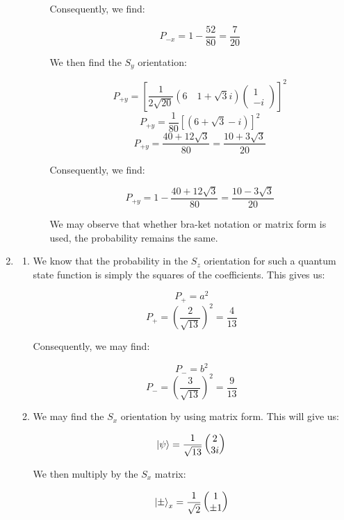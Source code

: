 \begin{enumerate}
\begin{enumerate}
\begin{enumerate}
            Consequently, we find:

            $$\boxed{P_{-x}=1-\frac{52}{80}=\frac{7}{20}}$$

            We then find the $S_y$ orientation:

            $$P_{+y}=\left[\frac{1}{2\sqrt{20}}\left( 6 \quad 1+\sqrt{3}i \right)\left( \begin{matrix} 1\\ -i\end{matrix} \right)\right]^2$$
            $$P_{+y}=\frac{1}{80}\left[\left( 6 +\sqrt{3} -i \right)\right]^2$$
            $$\boxed{P_{+y}=\frac{40+12\sqrt{3}}{80}=\frac{10+3\sqrt{3}}{20}}$$

            Consequently, we find:

            $$\boxed{P_{+y}=1-\frac{40+12\sqrt{3}}{80}=\frac{10-3\sqrt{3}}{20}}$$

            We may observe that whether bra-ket notation or matrix form is used, the probability remains the same.

        \end{enumerate}

    \end{enumerate}

  \item 

    \begin{enumerate}

      \item We know that the probability in the $S_z$ orientation for such a quantum state function is simply the squares of the coefficients. This gives us:

        $$P_+=a^2$$
        $$\boxed{P_+=\left(\frac{2}{\sqrt{13}}\right)^2=\frac{4}{13}}$$

        Consequently, we may find:

        $$P_-=b^2$$
        $$\boxed{P_-=\left(\frac{3}{\sqrt{13}}\right)^2=\frac{9}{13}}$$

      \item We may find the $S_x$ orientation by using matrix form. This will give us:

        $$\ket{\psi}=\frac{1}{\sqrt{13}}\left( \begin{matrix} 2\\ 3i \end{matrix}\right)$$

        We then multiply by the $S_x$ matrix:

        $$\ket{\pm}_x=\frac{1}{\sqrt{2}}\left( \begin{matrix} 1\\\pm1\end{matrix} \right)$$


\end{enumerate}
\end{enumerate}
